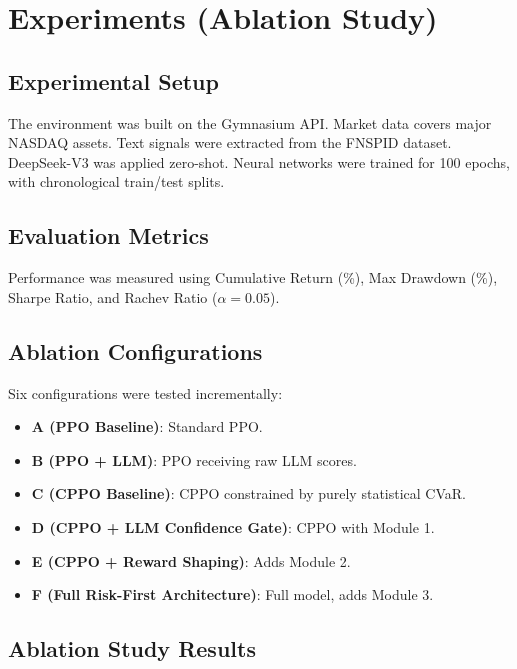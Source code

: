 \documentclass{article}
\begin{document}
\section{Experiments (Ablation Study)}

\subsection{Experimental Setup}

The environment was built on the Gymnasium API. Market data covers major NASDAQ assets. Text signals were extracted from the FNSPID dataset. DeepSeek-V3 was applied zero-shot. Neural networks were trained for 100 epochs, with chronological train/test splits.

\subsection{Evaluation Metrics}

Performance was measured using Cumulative Return (\%), Max Drawdown (\%), Sharpe Ratio, and Rachev Ratio ($\alpha = 0.05$).

\subsection{Ablation Configurations}

Six configurations were tested incrementally:
\begin{itemize}
    \item \textbf{A (PPO Baseline)}: Standard PPO.
    \item \textbf{B (PPO + LLM)}: PPO receiving raw LLM scores.
    \item \textbf{C (CPPO Baseline)}: CPPO constrained by purely statistical CVaR.
    \item \textbf{D (CPPO + LLM Confidence Gate)}: CPPO with Module 1.
    \item \textbf{E (CPPO + Reward Shaping)}: Adds Module 2.
    \item \textbf{F (Full Risk-First Architecture)}: Full model, adds Module 3.
\end{itemize}

\subsection{Ablation Study Results}
\end{document}
